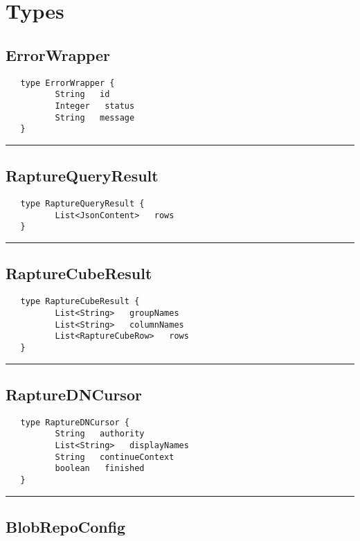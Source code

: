 \chapter{Types}
\section{ErrorWrapper}
\label{type:ErrorWrapper}

\begin{verbatim}
   type ErrorWrapper {
          String   id
          Integer   status
          String   message
   }
\end{verbatim}

\rule{15cm}{2pt}
\section{RaptureQueryResult}
\label{type:RaptureQueryResult}

\begin{verbatim}
   type RaptureQueryResult {
          List<JsonContent>   rows
   }
\end{verbatim}

\rule{15cm}{2pt}
\section{RaptureCubeResult}
\label{type:RaptureCubeResult}

\begin{verbatim}
   type RaptureCubeResult {
          List<String>   groupNames
          List<String>   columnNames
          List<RaptureCubeRow>   rows
   }
\end{verbatim}

\rule{15cm}{2pt}
\section{RaptureDNCursor}
\label{type:RaptureDNCursor}

\begin{verbatim}
   type RaptureDNCursor {
          String   authority
          List<String>   displayNames
          String   continueContext
          boolean   finished
   }
\end{verbatim}

\rule{15cm}{2pt}
\section{BlobRepoConfig}
\label{type:BlobRepoConfig}


